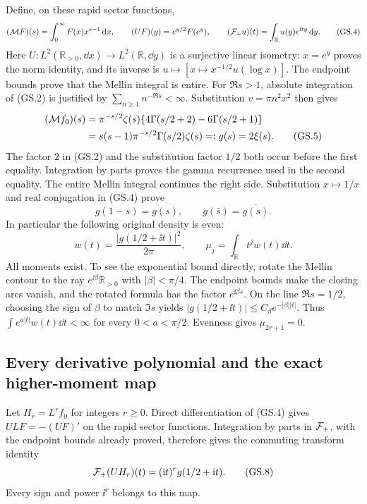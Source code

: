 Define, on these rapid sector functions,
\begin{equation}
 (\mathcal M F)(s)=\int_0^\infty F(x)x^{s-1}\,\mathrm d x,
 \qquad (UF)(y)=e^{y/2}F(e^y),
 \qquad (\mathcal F_+u)(t)=\int_{\mathbb R}u(y)e^{\mathrm i ty}\,\mathrm d y.
 \tag{GS.4}
\end{equation}
Here $U:L^2(\mathbb R_{>0},\dd x)\to L^2(\mathbb R,\dd y)$
is a surjective linear isometry: $x=e^y$ proves the norm identity,
and its inverse is $u\mapsto[x\mapsto x^{-1/2}u(\log x)]$.
The endpoint bounds prove that the Mellin integral is entire.
For $\Re s>1$, absolute integration of (GS.2) is justified by
$\sum_{n\ge1}n^{-\Re s}<\infty$. Substitution $v=\pi n^2x^2$
then gives
\begin{align}
 (\mathcal M f_0)(s)
 &=\pi^{-s/2}\zeta(s)
       \{4\Gamma(s/2+2)-6\Gamma(s/2+1)\}\notag\\
 &=s(s-1)\pi^{-s/2}\Gamma(s/2)\zeta(s)=:g(s)=2\xi(s).
 \tag{GS.5}
\end{align}
The factor $2$ in (GS.2) and the substitution factor $1/2$
both occur before the first equality. Integration by parts proves
the gamma recurrence used in the second equality. The entire Mellin
integral continues the right side. Substitution $x\mapsto1/x$
and real conjugation in (GS.4) prove
\begin{equation}
 g(1-s)=g(s),\qquad g(\bar s)=\overline{g(s)}.
 \tag{GS.6}
\end{equation}
In particular the following original density is even:
\begin{equation}
 w(t)=\frac{|g(1/2+\ii t)|^2}{2\pi},\qquad
 \mu_j=\int_{\mathbb R}t^j w(t)\dd t.\tag{GS.7}
\end{equation}
All moments exist. To see the exponential bound directly, rotate
the Mellin contour to the ray $e^{\ii\beta}\mathbb R_{>0}$ with
$|\beta|<\pi/4$. The endpoint bounds make the closing arcs vanish,
and the rotated formula has the factor $e^{\ii\beta s}$.
On the line $\Re s=1/2$, choosing the sign of $\beta$ to match
$\Im s$ yields $|g(1/2+\ii t)|\le C_\beta e^{-|\beta||t|}$.
Thus $\int e^{a|t|}w(t)\dd t<\infty$ for every $0<a<\pi/2$.
Evenness gives $\mu_{2r+1}=0$.

\subsection{Every derivative polynomial and the exact higher-moment map}

Let $H_r=L^rf_0$ for integers $r\ge0$. Direct differentiation of
(GS.4) gives $ULF=-(UF)'$ on the rapid sector functions. Integration
by parts in $\mathcal F_+$, with the endpoint bounds already proved, therefore
gives the commuting transform identity
\begin{equation}
 \mathcal F_+(UH_r)(t)=(\mathrm i t)^r g(1/2+\mathrm i t).\tag{GS.8}
\end{equation}
Every sign and power $\ii^r$ belongs to this map.

